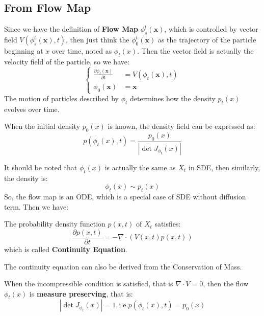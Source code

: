 \subsection{From Flow Map}
Since we have the definition of \textbf{Flow Map} $\phi_s^t(\mathbf{x})$, which is controlled by vector field $V(\phi_s^t(\mathbf{x}), t)$, 
then just think the $\phi_0^t(\mathbf{x})$ as the trajectory of the particle beginning at $x$ over time, noted as $\phi_t(x)$.
Then the vector field is actually the velocity field of the particle, so we have:
\begin{equation}\left\{
    \begin{aligned}
        \frac{\partial \phi_t(\mathbf{x})}{\partial t} &= V(\phi_t(\mathbf{x}), t)\\
        \phi_0(\mathbf{x}) &= \mathbf{x}
    \end{aligned}\right.
\end{equation}
The motion of particles described by $\phi_t$ determines how the density $p_t(x)$ evolves over time. 
\begin{theorem}
    When the initial density $p_0(x)$ is known, the density field can be expressed as:
\begin{equation}
    p(\phi_t(x), t) = \frac{p_0(x)}{\left|\det J_{\phi_t}(x)\right|}
\end{equation}
\end{theorem}

It should be noted that $\phi_t(x)$ is actually the same as $X_t$ in SDE, then similarly, the density is:
\begin{equation}
    \phi_t(x) \sim p_t(x)
\end{equation}
So, the flow map is an ODE, which is a special case of SDE without diffusion term. Then we have:
\begin{theorem}
    The probability density function $p(x, t)$ of $X_t$ satisfies:
    \begin{equation}
        \frac{\partial p(x, t)}{\partial t} = -\nabla\cdot\left(V(x, t)p(x, t)\right)
    \end{equation}
    which is called \textbf{Continuity Equation}.
\end{theorem}
\begin{remark}
    The continuity equation can also be derived from the Conservation of Mass. 
\end{remark}

\begin{theorem}
    When the incompressible condition is satisfied, that is $\nabla\cdot V=0$, then the flow $\phi_t(x)$ is \textbf{measure preserving}, that is:
    \begin{equation}
        \left|\det J_{\phi_t}(x)\right|=1, \text{i.e.}p(\phi_t(x), t) = p_0(x)
    \end{equation}
\end{theorem}

